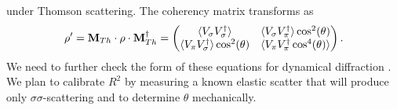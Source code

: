 \documentclass[aps,onecolumn, notitlepage, longbibliography]{revtex4-1}
\begin{document}
under Thomson scattering. The coherency matrix transforms as 
\begin{equation}
{\bf \rho}^\prime = {\bf M}_{Th} \cdot {\bf \rho} \cdot {\bf M}_{Th}^{\dagger} =
  \begin{pmatrix}
    \langle V_{\sigma}V_{\sigma}^{\dagger} \rangle  & \langle V_{\sigma}V_{\pi}^{\dagger}  \rangle \cos^2(\theta) \\
    \langle V_{\pi}V_{\sigma}^{\dagger} \rangle \cos^2(\theta) &  \langle V_{\pi}V_{\pi}^{\dagger} \cos^4(\theta)\rangle
  \end{pmatrix} .
\end{equation}
We need to further check the form of these equations for dynamical diffraction \cite{Malgrange1991}. We plan to calibrate $R^2$ by measuring a known elastic scatter that will produce only $\sigma \sigma$-scattering and to determine $\theta$ mechanically. 


\end{document}
